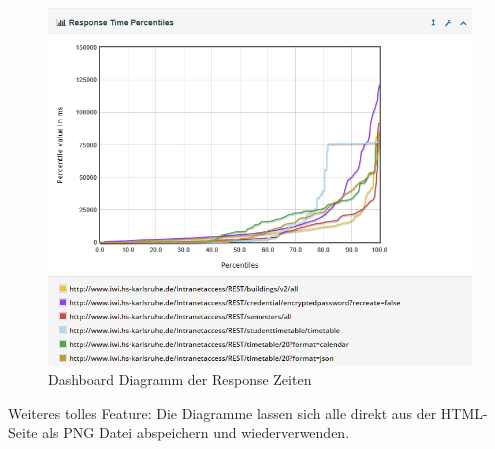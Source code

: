 \documentclass[a4paper,12pt]{article}
\begin{document}
\begin{figure}[htb]%
 \centering
    \includegraphics[width=1\textwidth]{bilder/response_time_dashboard.png}
  \caption{Dashboard Diagramm der Response Zeiten}
  \label{fig:response_time_dashboard}
\end{figure}

Weiteres tolles Feature: Die Diagramme lassen sich alle direkt aus der HTML-Seite als PNG Datei abspeichern und wiederverwenden.
\end{document}

